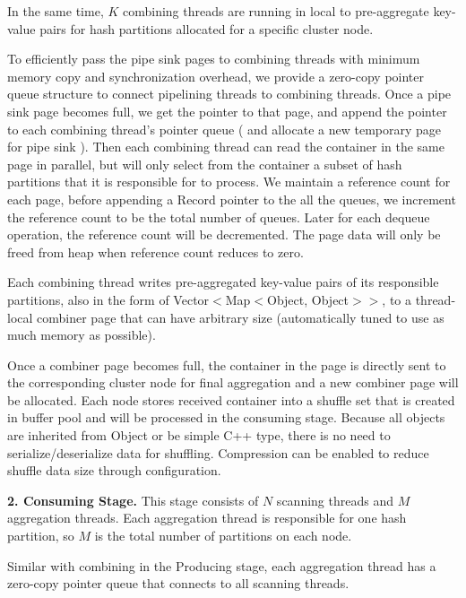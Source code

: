In the same time, $K$ combining threads are running in local to pre-aggregate key-value pairs for hash partitions allocated for a specific cluster node. 

To efficiently pass the pipe sink pages to combining threads with minimum memory copy and synchronization overhead, we provide a zero-copy pointer queue structure to connect pipelining threads to combining threads. Once a pipe sink page becomes full, we get the pointer to that page, and append the pointer to each combining thread's pointer queue ( and allocate a new temporary page for pipe sink ). Then each combining thread can read the container in the same page in parallel, but will only select from the container a subset of hash partitions that it is responsible for to process. We maintain a reference count for each page, before appending a Record pointer to the all the queues, we increment the reference count to be the total number of queues. Later for each dequeue operation, the reference count will be decremented. The page data will only be freed from heap when reference count reduces to zero. 

Each combining thread writes pre-aggregated key-value pairs of its responsible partitions, also in the form of Vector$<$Map$<$Object, Object$>$$>$, to a thread-local combiner page that can have arbitrary size (automatically tuned to use as much memory as possible). 

Once a combiner page becomes full, the container in the page is directly sent to the corresponding cluster node for final aggregation and a new combiner page will be allocated. Each node stores received container into a shuffle set that is created in buffer pool and will be processed in the consuming stage. Because all objects are inherited from Object or be simple C++ type, there is no need to serialize/deserialize data for shuffling. Compression can be enabled to reduce shuffle data size through configuration.
 
\vspace{5pt}
{\bf 2. Consuming Stage.} This stage consists of $N$ scanning threads and $M$ aggregation threads. Each aggregation thread is responsible for one hash partition,  so $M$ is the total number of partitions on each node.

Similar with combining in the Producing stage, each aggregation thread has a zero-copy pointer queue that connects to all scanning threads.

